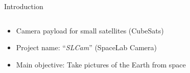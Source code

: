 %
%
%
%
%

%
%
%
%
%

\begin{frame}{Introduction}

    \begin{columns}[t]
        \begin{column}[t]{0.6\textwidth}
            \begin{itemize}
                \item Camera payload for small satellites (CubeSats)
                \vspace{0.5cm}
                \item Project name: ``\textit{SLCam}'' (SpaceLab Camera)
                \vspace{0.5cm}
                \item Main objective: Take pictures of the Earth from space
            \end{itemize}
        \end{column}
        \begin{column}[t]{0.4\textwidth}
        \end{column}
    \end{columns}

\end{frame}
